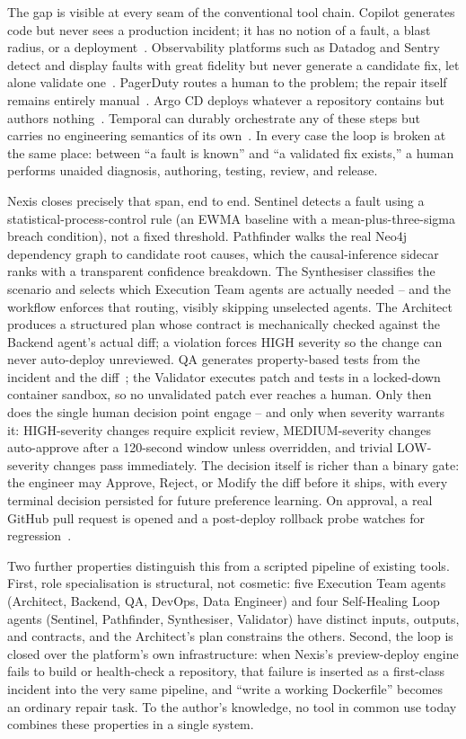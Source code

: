 The gap is visible at every seam of the conventional tool chain. Copilot
generates code but never sees a production incident; it has no notion of a
fault, a blast radius, or a deployment~\cite{copilot}. Observability
platforms such as Datadog and Sentry detect and display faults with great
fidelity but never generate a candidate fix, let alone validate
one~\cite{datadog,sentry}. PagerDuty routes a human to the problem; the
repair itself remains entirely manual~\cite{pagerduty}. Argo CD deploys
whatever a repository contains but authors nothing~\cite{argocd}. Temporal
can durably orchestrate any of these steps but carries no engineering
semantics of its own~\cite{temporal}. In every case the loop is broken at
the same place: between ``a fault is known'' and ``a validated fix exists,''
a human performs unaided diagnosis, authoring, testing, review, and release.

Nexis closes precisely that span, end to end. Sentinel detects a fault using
a statistical-process-control rule (an EWMA baseline with a
mean-plus-three-sigma breach condition), not a fixed threshold. Pathfinder
walks the real Neo4j dependency graph to candidate root causes, which the
causal-inference sidecar ranks with a transparent confidence breakdown. The
Synthesiser classifies the scenario and selects which Execution Team agents
are actually needed -- and the workflow enforces that routing, visibly
skipping unselected agents. The Architect produces a structured plan whose
 contract is mechanically checked against the Backend
agent's actual diff; a violation forces HIGH severity so the change can never
auto-deploy unreviewed. QA generates property-based tests from the incident
and the diff~\cite{hypothesis}; the Validator executes patch and tests in a
locked-down container sandbox, so no unvalidated patch ever reaches a human.
Only then does the single human decision point engage -- and only when
severity warrants it: HIGH-severity changes require explicit review,
MEDIUM-severity changes auto-approve after a 120-second window unless
overridden, and trivial LOW-severity changes pass immediately. The decision
itself is richer than a binary gate: the engineer may Approve, Reject, or
Modify the diff before it ships, with every terminal decision persisted for
future preference learning. On approval, a real GitHub pull request is opened
and a post-deploy rollback probe watches for regression~\cite{argocd}.

Two further properties distinguish this from a scripted pipeline of existing
tools. First, role specialisation is structural, not cosmetic: five Execution
Team agents (Architect, Backend, QA, DevOps, Data Engineer) and four
Self-Healing Loop agents (Sentinel, Pathfinder, Synthesiser, Validator) have
distinct inputs, outputs, and contracts, and the Architect's plan constrains
the others. Second, the loop is closed over the platform's own
infrastructure: when Nexis's preview-deploy engine fails to build or
health-check a repository, that failure is inserted as a first-class incident
into the very same pipeline, and ``write a working Dockerfile'' becomes an
ordinary repair task. To the author's knowledge, no tool in common use today
combines these properties in a single system.

